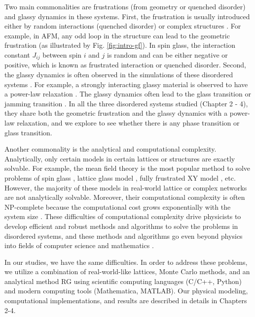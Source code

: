 Two main commonalities are frustrations (from geometry or quenched disorder) and glassy dynamics  in these systems. First, the frustration is usually introduced either by  random interactions (quenched disorder) or complex structures \cite{vannimenus1977}. For example, in AFM, any odd loop in the structure can lead to the geometric frustration \cite{wannier1950afm} (as illustrated by Fig. \ref{fig:intro-gf}). In spin glass, the interaction constant $J_{ij}$ between spin $i$ and $j$ is random and can be either negative or positive, which is known as frustrated interaction \cite{edwards1975theory} or quenched disorder.
Second, the glassy dynamics is often observed in the simulations of these disordered systems \cite{lunkenheimer2000}. For example, a strongly interacting glassy material is observed to have a power-law relaxation \cite{palmer1984}. The glassy dynamics often lead to the glass transition \cite{biroli2013perspective} or jamming transition \cite{Liu1998}. 
In all the three disordered systems studied (Chapter 2 - 4), they share both the geometric frustration and the glassy dynamics with a power-law relaxation, and we explore to see whether there is any phase transition or glass transition.

Another commonality is the analytical and computational complexity. Analytically, only certain models in certain lattices or structures are exactly solvable. For example, the mean field theory  \cite{kadanoff2009} is the most popular method to solve problems of spin glass \cite{sherrington1975}, lattice glass model \cite{Biroli02}, fully frustrated XY model \cite{kim2001xy}, etc. However, the majority of these models in real-world lattice or complex networks are not analytically solvable. Moreover, their computational complexity is often NP-complete \cite{garey1983} because the computational cost grows exponentially with the system size \cite{barahona1982, weigt2000}. These difficulties of computational complexity drive physicists to develop efficient and robust methods and algorithms to solve the problems in disordered systems, and these methods and algorithms go even beyond physics into fields of computer science and mathematics \cite{mezard1990spin, stein2013spin}.

In our studies, we have the same difficulties. In order to address these problems, we utilize a combination \cite{cheng2015jamming, ma2016prb} of real-world-like lattices, Monte Carlo methods, and an analytical method RG using scientific computing languages (C/C++, Python) and modern computing tools (Mathematica, MATLAB). Our physical modeling, computational implementations, and results are described in details in Chapters 2-4.


